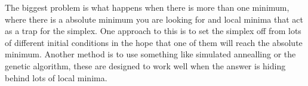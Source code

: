 \documentclass[11pt,a4paper]{scrartcl}
\begin{document}
The biggest problem is what happens when there is more than one
minimum, where there is a absolute minimum you are looking for and
local minima that act as a trap for the simplex. One approach to this
is to set the simplex off from lots of different initial conditions in
the hope that one of them will reach the absolute minimum. Another
method is to use something like simulated annealling or the genetic
algorithm, these are designed to work well when the answer is hiding
behind lots of local minima.
\end{document}
